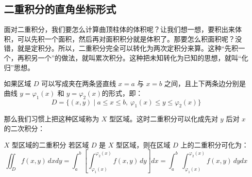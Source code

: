 \subsection{二重积分的直角坐标形式}

面对二重积分，我们要怎么计算曲顶柱体的体积呢？让我们想一想，要积出来体积，可以先积一个面积，然后再对面积积分就是体积了。那要怎么积面积呢？没错，就是定积分。所以，二重积分完全可以转化为两次定积分来算。这种“先积一个，再积另一个”的做法，就叫累次积分。这种把未知转化为已知的思想，就叫“化归”思想。

如果区域 \(D\) 可以写成夹在两条竖直线 \(x=a\) 与 \(x=b\) 之间，且上下两条边分别是曲线 \(y=\varphi_1(x)\) 和 \(y=\varphi_2(x)\)的形式，即：
\[
D=\{(x,y)\mid a\le x\le b,\ \varphi_1(x)\le y\le\varphi_2(x)\}
\]

那么我们习惯上把这种区域称为 $X$ 型区域。这时二重积分可以化成先对 \(y\) 后对 \(x\) 的二次积分：

\begin{theorem}{$X$ 型区域的二重积分}{}
    若区域 \(D\) 是 $X$ 型区域，则在区域 \(D\) 上的二重积分可化为：
    \[
\iint_D f(x,y)\,dxdy = \int_a^b\left[\int_{\varphi_1(x)}^{\varphi_2(x)} f(x,y)\,dy\right]dx = \int_a^b\ \int_{\varphi_1(x)}^{\varphi_2(x)} f(x,y)\,dydx
\]  
\end{theorem}


